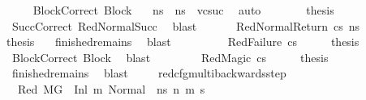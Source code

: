 \begin{isabellebody}
\ \ \ \ \isamarkupfalse%
\ BlockCorrect\ Block\ \ \isamarkupfalse%
\ {\isachardoublequoteopen}ns{\isacharprime}{\kern0pt}\ {\isacharequal}{\kern0pt}\ n{\isacharunderscore}{\kern0pt}s{\isachardoublequoteclose}\ \ {\isachardoublequoteopen}vcsuc{\isachardoublequoteclose}\ \isamarkupfalse%
\ auto\isanewline
\ \ \ \ \isamarkupfalse%
\ \isamarkupfalse%
\ {\isacharquery}{\kern0pt}thesis\isanewline
\ \ \ \ \ \ \isamarkupfalse%
\ {}\ SuccCorrect\ RedNormalSucc\ \isamarkupfalse%
\ blast\isanewline
\ \ \isamarkupfalse%
\isanewline
\ \ \isamarkupfalse%
\ {\isacharparenleft}{\kern0pt}RedNormalReturn\ cs\ ns{\isacharprime}{\kern0pt}{\isacharparenright}{\kern0pt}\isanewline
\ \ \ \ \isamarkupfalse%
\ \isamarkupfalse%
\ {\isacharquery}{\kern0pt}thesis\ \isamarkupfalse%
\ {}\ finished{\isacharunderscore}{\kern0pt}remains\ \isamarkupfalse%
\ blast\ \isanewline
\ \ \isamarkupfalse%
\isanewline
\ \ \ \ \isamarkupfalse%
\ {\isacharparenleft}{\kern0pt}RedFailure\ cs{\isacharparenright}{\kern0pt}\isanewline
\ \ \isamarkupfalse%
\ \isamarkupfalse%
\ {\isacharquery}{\kern0pt}thesis\ \isamarkupfalse%
\ {}\ BlockCorrect\ Block\ \isamarkupfalse%
\ blast\isanewline
\ \ \isamarkupfalse%
\isanewline
\ \ \ \ \isamarkupfalse%
\ {\isacharparenleft}{\kern0pt}RedMagic\ cs{\isacharparenright}{\kern0pt}\isanewline
\ \ \isamarkupfalse%
\ \isamarkupfalse%
\ {\isacharquery}{\kern0pt}thesis\ \isamarkupfalse%
\ {}\ finished{\isacharunderscore}{\kern0pt}remains\ \isamarkupfalse%
\ blast\ \isanewline
\ \ \isamarkupfalse%
\isanewline
{}\isamarkupfalse%
%
\endisatagproof
{\isafoldproof}%
%
\isadelimproof
\isanewline
%
\endisadelimproof
\isanewline
{}\isamarkupfalse%
\ red{\isacharunderscore}{\kern0pt}cfg{\isacharunderscore}{\kern0pt}multi{\isacharunderscore}{\kern0pt}backwards{\isacharunderscore}{\kern0pt}step{\isacharunderscore}{\kern0pt}{}{\isacharcolon}{\kern0pt}\isanewline
\ \ \isanewline
\ \ \ Red{\isacharcolon}{\kern0pt}\ {\isachardoublequoteopen}M{\isacharcomma}{\kern0pt}{\isasymLambda}{\isacharcomma}{\kern0pt}{\isasymGamma}{\isacharcomma}{\kern0pt}{\isasymOmega}{\isacharcomma}{\kern0pt}G\ {\isasymturnstile}\ {\isacharparenleft}{\kern0pt}Inl\ m{\isacharcomma}{\kern0pt}\ {\isacharparenleft}{\kern0pt}Normal\ \ n{\isacharunderscore}{\kern0pt}s{\isacharparenright}{\kern0pt}{\isacharparenright}{\kern0pt}\ {\isacharminus}{\kern0pt}n{\isasymrightarrow}{\isacharasterisk}{\kern0pt}\ {\isacharparenleft}{\kern0pt}m{\isacharprime}{\kern0pt}{\isacharcomma}{\kern0pt}\ s{\isacharprime}{\kern0pt}{\isacharparenright}{\kern0pt}{\isachardoublequoteclose}\ \isanewline

\end{isabellebody}
